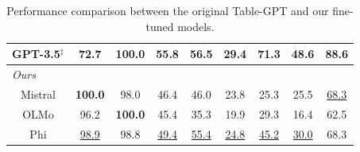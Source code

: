\documentclass[11pt]{article}
\newcommand{\grayc}[0]{\cellcolor[rgb]{0.957,0.957,0.957}}
\begin{document}
\begin{table}[t]
{\begin{tabular}{c|cccc|cccc}
    GPT-3.5$^\ddagger$ & 72.7 & \textbf{100.0} & \textbf{55.8} & \textbf{56.5} & 29.4 & \textbf{71.3} & \textbf{48.6} & \textbf{88.6} \\ 
\midrule
\multicolumn{9}{l}{\grayc \textit{Ours}} \\
\multicolumn{1}{c|}{Mistral} & \textbf{100.0} & 98.0 & 46.4 & 46.0 & 23.8 & 25.3 & 25.5 & \underline{68.3} \\
\multicolumn{1}{c|}{OLMo} & 96.2 & \textbf{100.0} & 45.4 & 35.3 & 19.9 & 29.3 & 16.4 & 62.5\\
\multicolumn{1}{c|}{Phi} & \underline{98.9} & 98.8 & \underline{49.4} & \underline{55.4} & \underline{24.8} & \underline{45.2} & \underline{30.0} & 68.3 \\
    \bottomrule
    \end{tabular}
    }
    \caption{Performance comparison between the original Table-GPT and our fine-tuned models.
    }
    \label{tab:mistral-tablegpt}
    \vspace{-0.5em}
  \end{table}%
  
  \begin{table}[t]
\centering
    \small
    \renewcommand{\arraystretch}{1.3}
    \setlength\tabcolsep{2pt}
    \caption{Performance comparison between training Mistral v0.3 7B Instruct on 13K instances versus 66K instances provided by \citet{li2023table}.
    }
    \label{tab:mistral-tablegpt-side-finding-all}
  \end{table}
\end{document}
